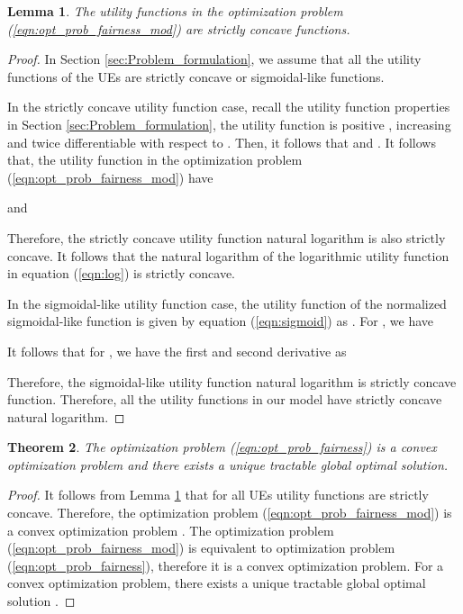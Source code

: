 \documentclass[journal]{IEEEtran} 		\usepackage{amsmath,amssymb}
\newtheorem{thm}{Theorem}[section]
\newtheorem{lem}[thm]{Lemma}
\begin{document}
\begin{lem}\label{lem:concavity}
The utility functions  in the optimization problem (\ref{eqn:opt_prob_fairness_mod}) are strictly concave functions.
\end{lem}
\begin{proof}
In Section \ref{sec:Problem_formulation}, we assume that all the utility functions of the UEs are strictly concave or sigmoidal-like functions.

In the strictly concave utility function case, recall the utility function properties in Section \ref{sec:Problem_formulation}, the utility function is positive , increasing and twice differentiable with respect to . Then, it follows that  and . It follows that, the utility function  in the optimization problem (\ref{eqn:opt_prob_fairness_mod}) have

and

Therefore, the strictly concave utility function  natural logarithm   is also strictly concave. It follows that the natural logarithm  of the logarithmic utility function in equation (\ref{eqn:log}) is strictly concave.

In the sigmoidal-like utility function case, the utility function of the normalized sigmoidal-like function is given by equation (\ref{eqn:sigmoid}) as . For , we have

It follows that for , we have the first and second derivative as

Therefore, the sigmoidal-like utility function  natural logarithm   is strictly concave function. Therefore, all the utility functions in our model have strictly concave natural logarithm.
\end{proof}
\begin{thm}\label{thm:global_soln}
The optimization problem (\ref{eqn:opt_prob_fairness}) is a convex optimization problem and there exists a unique tractable global optimal solution.
\end{thm}
\begin{proof}
It follows from Lemma \ref{lem:concavity} that for all UEs utility functions are strictly concave. Therefore, the optimization problem (\ref{eqn:opt_prob_fairness_mod}) is a convex optimization problem \cite{Boyd2004}. The optimization problem (\ref{eqn:opt_prob_fairness_mod}) is equivalent to optimization problem (\ref{eqn:opt_prob_fairness}), therefore it is a convex optimization problem. For a convex optimization problem, there exists a unique tractable global optimal solution \cite{Boyd2004}.
\end{proof}
\end{document}
